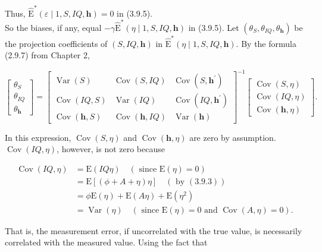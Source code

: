 \documentclass[10pt]{article}
\begin{document}
Thus, $\widehat{\mathrm{E}}^{*}(\varepsilon \mid 1, S, I Q, \mathbf{h})=0$ in (3.9.5).\\
So the biases, if any, equal $-\gamma \widehat{\mathrm{E}}^{*}(\eta \mid 1, S, I Q, \mathbf{h})$ in (3.9.5). Let $\left(\theta_{S}, \theta_{I Q}, \theta_{\mathbf{h}}\right)$ be the projection coefficients of $(S, I Q, \mathbf{h})$ in $\widehat{\mathrm{E}}^{*}(\eta \mid 1, S, I Q, \mathbf{h})$. By the formula (2.9.7) from Chapter 2,

\[
\left[\begin{array}{c}
\theta_{S}  \tag{3.9.6}\\
\theta_{I Q} \\
\theta_{\mathbf{h}}
\end{array}\right]=\left[\begin{array}{ccc}
\operatorname{Var}(S) & \operatorname{Cov}(S, I Q) & \operatorname{Cov}\left(S, \mathbf{h}^{\prime}\right) \\
\operatorname{Cov}(I Q, S) & \operatorname{Var}(I Q) & \operatorname{Cov}\left(I Q, \mathbf{h}^{\prime}\right) \\
\operatorname{Cov}(\mathbf{h}, S) & \operatorname{Cov}(\mathbf{h}, I Q) & \operatorname{Var}(\mathbf{h})
\end{array}\right]^{-1}\left[\begin{array}{c}
\operatorname{Cov}(S, \eta) \\
\operatorname{Cov}(I Q, \eta) \\
\operatorname{Cov}(\mathbf{h}, \eta)
\end{array}\right] .
\]

In this expression, $\operatorname{Cov}(S, \eta)$ and $\operatorname{Cov}(\mathbf{h}, \eta)$ are zero by assumption. $\operatorname{Cov}(I Q, \eta)$, however, is not zero because

$$
\begin{aligned}
\operatorname{Cov}(I Q, \eta) & =\mathrm{E}(I Q \eta) \quad(\text { since } \mathrm{E}(\eta)=0) \\
& =\mathrm{E}[(\phi+A+\eta) \eta] \quad(\text { by }(3.9 .3)) \\
& =\phi \mathrm{E}(\eta)+\mathrm{E}(A \eta)+\mathrm{E}\left(\eta^{2}\right) \\
& =\operatorname{Var}(\eta) \quad(\text { since } \mathrm{E}(\eta)=0 \text { and } \operatorname{Cov}(A, \eta)=0) .
\end{aligned}
$$

That is, the measurement error, if uncorrelated with the true value, is necessarily correlated with the measured value. Using the fact that
\end{document}
